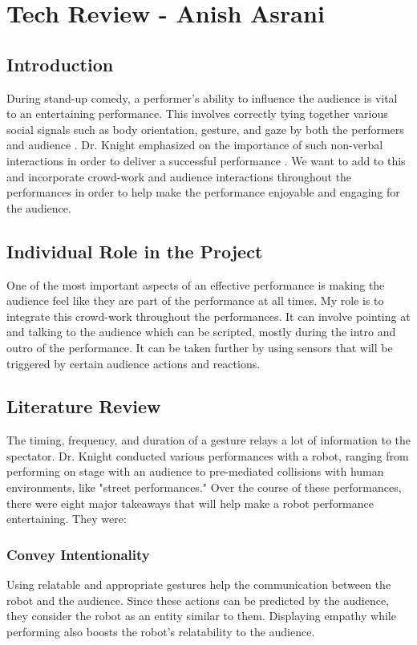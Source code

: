 

\section{Tech Review - Anish Asrani}
\subsection{Introduction}

During stand-up comedy, a performer's ability to influence the audience is vital to an entertaining performance. This involves correctly tying together various social signals such as body orientation, gesture, and gaze by both the performers and audience \cite{RobotComedyLab:2015}. Dr. Knight emphasized on the importance of such non-verbal interactions in order to deliver a successful performance \cite{KnightEightLessons:2011}. We want to add to this and incorporate crowd-work and audience interactions throughout the performances in order to help make the performance enjoyable and engaging for the audience.

\subsection{Individual Role in the Project}
One of the most important aspects of an effective performance is making the audience feel like they are part of the performance at all times. My role is to integrate this crowd-work throughout the performances. It can involve pointing at and talking to the audience which can be scripted, mostly during the intro and outro of the performance. It can be taken further by using sensors that will be triggered by certain audience actions and reactions.

\subsection{Literature Review}
The timing, frequency, and duration of a gesture relays a lot of information to the spectator. Dr. Knight conducted various performances with a robot, ranging from performing on stage with an audience to pre-mediated collisions with human environments, like "street performances." Over the course of these performances, there were eight major takeaways that will help make a robot performance entertaining. They were:

\subsubsection{Convey Intentionality}
Using relatable and appropriate gestures help the communication between the robot and the audience. Since these actions can be predicted by the audience, they consider the robot as an entity similar to them. Displaying empathy while performing also boosts the robot's relatability to the audience.

